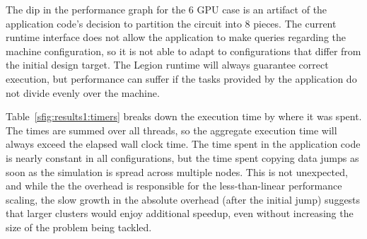 The dip in the performance graph for the 6 GPU case is an artifact of the
application code's decision to partition the circuit into 8 pieces.  The
current runtime interface does not allow the application to make queries
regarding the machine configuration, so it is not able to adapt to
configurations that differ from the initial design target.  The Legion runtime
will always guarantee correct execution, but performance can suffer if the
tasks provided by the application do not divide evenly over the machine.

Table~\ref{sfig:results1:timers} breaks down the execution time by where it was
spent.  The times are summed over all threads, so the aggregate execution time
will always exceed the elapsed wall clock time.  The time spent in the 
application code is nearly constant in all configurations, but the time spent
copying data jumps as soon as the simulation is spread across multiple nodes.
This is not unexpected, and while the the overhead is responsible for the
less-than-linear performance scaling, the slow growth in the absolute overhead
(after the initial jump) suggests that larger clusters would enjoy additional
speedup, even without increasing the size of the problem being tackled.


